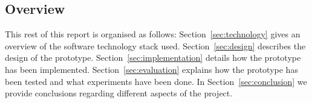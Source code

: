 \subsection{Overview}
This rest of this report is organised as follows:
Section~\ref{sec:technology} gives an overview of the software technology stack used. 
Section~\ref{sec:design} describes the design of the prototype. 
Section~\ref{sec:implementation} details how the prototype has been implemented. 
Section~\ref{sec:evaluation} explains how the prototype has been tested and what experiments have been done.  
In Section~\ref{sec:conclusion} we provide conclusions regarding different aspects of the project.

